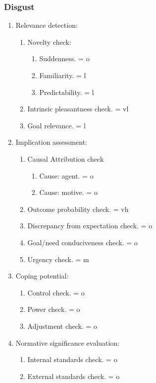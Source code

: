 {{\subsubsection{Disgust}

\begin{enumerate}
\item  Relevance detection:
\begin{enumerate}
\item  Novelty check:
\begin{enumerate}
\item  Suddenness. = o
\item  Familiarity. = l
\item  Predictability. = l
\end{enumerate}
\item  Intrinsic pleasantness check. = vl
\item  Goal relevance. = l
\end{enumerate}
\item  Implication assessment:
\begin{enumerate}
\item  Causal Attribution check
\begin{enumerate}
\item  Cause: agent. = o
\item  Cause: motive. = o
\end{enumerate}
\item  Outcome probability check. = vh
\item  Discrepancy from expectation check. = o
\item  Goal/need conduciveness check. = o
\item  Urgency check. = m
\end{enumerate}
\item  Coping potential:
\begin{enumerate}
\item  Control check. = o
\item  Power check. = o
\item  Adjustment check. = o
\end{enumerate}
\item  Normative significance evaluation:
\begin{enumerate}
\item  Internal standards check. = o
\item  External standards check. = o
\end{enumerate}
\end{enumerate}


}}

